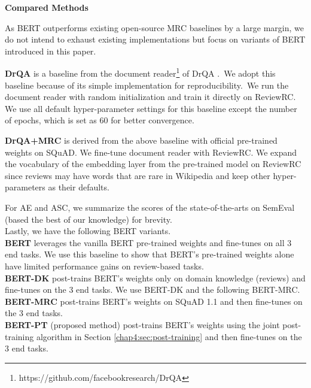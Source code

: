 \begin{table}[H]
    \centering
    \caption{Statistics of ReviewRC Dataset}
\label{chap6:tbl:rrc}
\end{table}


\textbf{Compared Methods}

As BERT outperforms existing open-source MRC baselines by a large margin, we do not intend to exhaust existing implementations but focus on variants of BERT introduced in this paper.

\textbf{DrQA} is a baseline from the document reader\footnote{https://github.com/facebookresearch/DrQA} of DrQA \cite{chen2017reading}.~We adopt this baseline because of its simple implementation for reproducibility.~We run the document reader with random initialization and train it directly on ReviewRC.
We use all default hyper-parameter settings for this baseline except the number of epochs, which is set as 60 for better convergence.

\textbf{DrQA+MRC} is derived from the above baseline with official pre-trained weights on SQuAD.
We fine-tune document reader with ReviewRC. We expand the vocabulary of the embedding layer from the pre-trained model on ReviewRC since reviews may have words that are rare in Wikipedia and keep other hyper-parameters as their defaults.

For AE and ASC, we summarize the scores of the state-of-the-arts on SemEval (based the best of our knowledge) for brevity.\\

Lastly, we have the following BERT variants.\\
\textbf{BERT} leverages the vanilla BERT pre-trained weights and fine-tunes on all 3 end tasks. We use this baseline to show that BERT's pre-trained weights alone have limited performance gains on review-based tasks.\\
\textbf{BERT-DK} post-trains BERT's weights only on domain knowledge (reviews) and fine-tunes on the 3 end tasks. We use BERT-DK and the following BERT-MRC.\\
\textbf{BERT-MRC} post-trains BERT's weights on SQuAD 1.1 and then fine-tunes on the 3 end tasks.\\
\textbf{BERT-PT} (proposed method) post-trains BERT's weights using the joint post-training algorithm in Section \ref{chap4:sec:post-training} and then fine-tunes on the 3 end tasks.

